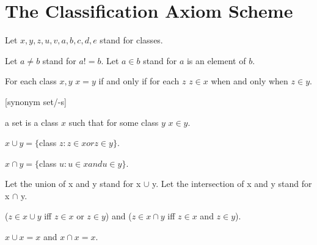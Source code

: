 \documentclass[a4paper,draft]{amsproc}
\begin{document}
\section{The Classification Axiom Scheme}
\begin{forthel}

Let $x, y, z, u, v, a, b, c, d, e$ stand for classes.

Let $a \neq b$ stand for $a != b$.
Let $a \in b$ stand for $a$ is an element of $b$.

\begin{axiom}[I] 
For each class $x, y$ $x = y$ if and only if for each $z$ $z \in x$ 
when and only when $z \in y$.
\end{axiom}


[synonym set/-s]

\begin{definition}[1]
a set is a class $x$ such that for some class $y$ $x \in y$.
\end{definition}


\begin{definition}[2] 
$x \cup y = \{$class $z : z \in x or z \in y \}$.
\end{definition}

\begin{definition}[3] 
$x \cap y = \{$class $u : u \in x and u \in y \}$.
\end{definition}

Let the union of x and y stand for x $\cup$ y.
Let the intersection of x and y stand for x $\cap$ y.

\begin{theorem}[4]
($z \in x \cup y$ iff $z \in x$ or $z \in y$)
and ($z \in x \cap y$ iff $z \in x$ and $z \in y$).
\end{theorem}

\begin{theorem}[5]
$x \cup x = x$ and $x \cap x = x$.
\end{theorem}


\end{forthel}
\end{document}
